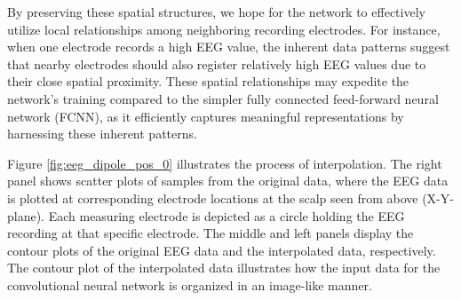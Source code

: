 \documentclass[a4paper, UKenglish, 11pt]{uiomaster}
\begin{document}
By preserving these spatial structures, we hope for the network to effectively utilize local relationships among neighboring recording electrodes. For instance, when one electrode records a high EEG value, the inherent data patterns suggest that nearby electrodes should also register relatively high EEG values due to their close spatial proximity. These spatial relationships may expedite the network's training compared to the simpler fully connected feed-forward neural network (FCNN), as it efficiently captures meaningful representations by harnessing these inherent patterns.

Figure \ref{fig:eeg_dipole_pos_0} illustrates the process of interpolation. The right panel shows scatter plots of samples from the original data, where the EEG data is plotted at corresponding electrode locations at the scalp seen from above (X-Y-plane). Each measuring electrode is depicted as a circle holding the EEG recording at that specific electrode. The middle and left panels display the contour plots of the original EEG data and the interpolated data, respectively. The contour plot of the interpolated data illustrates how the input data for the convolutional neural network is organized in an image-like manner.
\end{document}
